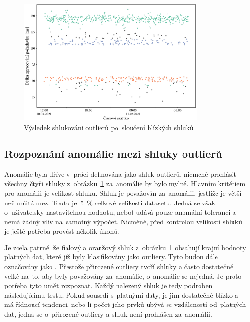 \begin{figure}[!hbt]
    \centering
    \includegraphics[width=0.84\textwidth]{obrazky/anomaly-detection-merged-clusters.pdf}
    \caption{Výsledek shlukování outlierů po~sloučení blízkých shluků}
    \label{anomaly-detection-merged-clusters-img}
\end{figure}

\subsection{Rozpoznání anomálie mezi shluky outlierů}
Anomálie byla dříve v~práci definována jako shluk outlierů, nicméně prohlásit všechny čtyři shluky z~obrázku~\ref{anomaly-detection-merged-clusters-img} za~anomálie by bylo mylné. Hlavním kritériem pro anomálii je velikost shluku. Shluk je považován za~anomálii, jestliže je větší než určitá mez. Touto je~5~\% celkové velikosti datasetu. Jedná se však o~uživatelsky nastavitelnou hodnotu, neboť udává pouze anomální toleranci a nemá žádný vliv na~samotný výpočet. Nicméně, před kontrolou velikosti shluků je ještě potřeba provést několik úkonů.

Je zcela patrné, že fialový a oranžový shluk z~obrázku~\ref{anomaly-detection-merged-clusters-img} obsahují krajní hodnoty platných dat, které již byly klasifikovány jako outliery. Tyto budou dále označovány jako . Přestože přirozené outliery tvoří shluky a často dostatečně velké na~to, aby byly považovány za~anomálie, o~anomálie se nejedná. Je proto potřeba tyto umět rozpoznat. Každý nalezený shluk je tedy podroben následujícímu testu. Pokud sousedí s~platnými daty, je jim dostatečně blízko a má řídnoucí tendenci, nebo-li počet jeho prvků ubývá se vzdáleností od~platných dat, jedná se o~přirozené outliery a shluk není prohlášen za~anomálii.

